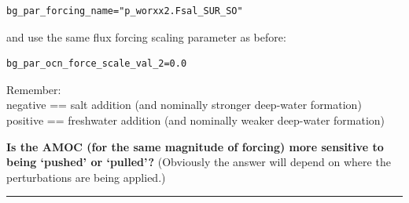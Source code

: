 \vspace{-2mm}\small\begin{verbatim}
bg_par_forcing_name="p_worxx2.Fsal_SUR_SO"
\end{verbatim}\normalsize\vspace{-2mm}

and use the same flux forcing scaling parameter as before:

\vspace{-2mm}\small\begin{verbatim}
bg_par_ocn_force_scale_val_2=0.0
\end{verbatim}\normalsize\vspace{-2mm}

\noindent Remember:
\\negative == salt addition (and nominally stronger deep-water formation)
\\positive == freshwater addition (and nominally weaker deep-water formation)

\vspace{1mm}
\noindent \textbf{Is the AMOC (for the same magnitude of forcing) more sensitive to being ‘pushed’ or ‘pulled’?} (Obviously the answer will  depend on where the perturbations are being applied.)

\vspace{1mm}\noindent\rule{4cm}{0.5pt}\vspace{2mm}

